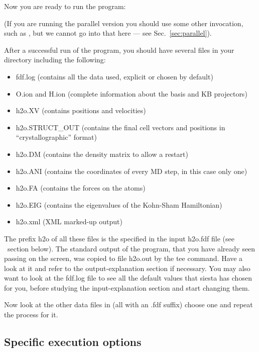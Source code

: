 \noindent
Now you are ready to run the program:


\noindent
(If you are running the parallel version you should use some other
invocation, such as , but we cannot
go into that here --- see Sec.~\ref{sec:parallel}).

After a successful run of the program, you should have several
files in your directory including the following:
\begin{itemize}

\item fdf.log
 (contains all the data used, explicit or chosen by default)
\item O.ion and H.ion
 (complete information about the basis and KB projectors)
\item h2o.XV
 (contains positions and velocities)
\item h2o.STRUCT\_OUT
 (contains the final cell vectors and positions in
 ``crystallographic'' format)
\item h2o.DM
 (contains the density matrix to allow a restart)
\item h2o.ANI
 (contains the coordinates of every MD step, in this case only one)
\item h2o.FA
 (contains the forces on the atoms)
\item h2o.EIG
 (contains the eigenvalues of the Kohn-Sham Hamiltonian)
\item h2o.xml
 (XML marked-up output)
\end{itemize}

The prefix h2o of all these files is the 
specified in the input h2o.fdf file (see \fdflib\ section below).
The standard output of the program, that you
have already seen passing on the screen, was copied to
file h2o.out by the tee command. Have a look at it
and refer to the output-explanation section if necessary.
You may also want to look at the fdf.log file to see all
the default values that siesta has chosen for you, before
studying the input-explanation section and start changing them.

Now look at the other data files in 
(all with an .fdf suffix) choose one and repeat the process for it.

\subsection{Specific execution options}

